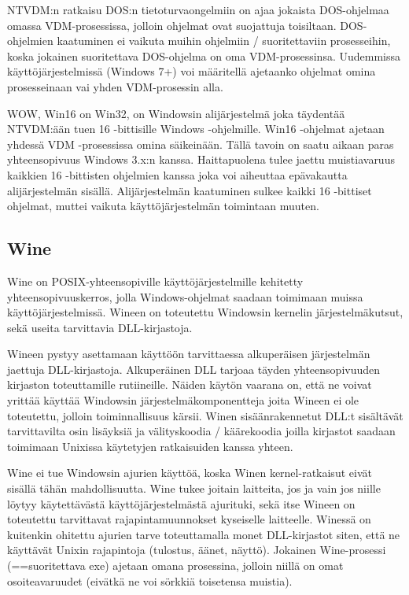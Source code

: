 NTVDM:n ratkaisu DOS:n tietoturvaongelmiin on ajaa jokaista DOS-ohjelmaa omassa VDM-prosessissa, jolloin ohjelmat ovat suojattuja toisiltaan. DOS-ohjelmien kaatuminen ei vaikuta muihin ohjelmiin / suoritettaviin prosesseihin, koska jokainen suoritettava DOS-ohjelma on oma VDM-prosessinsa. Uudemmissa käyttöjärjestelmissä (Windows 7+) voi määritellä ajetaanko ohjelmat omina prosesseinaan vai yhden VDM-prosessin alla.


WOW, Win16 on Win32, on Windowsin alijärjestelmä joka täydentää NTVDM:ään tuen 16 -bittisille Windows -ohjelmille. Win16 -ohjelmat ajetaan yhdessä VDM -prosessissa omina säikeinään. Tällä tavoin on saatu aikaan paras yhteensopivuus Windows 3.x:n kanssa. Haittapuolena tulee jaettu muistiavaruus kaikkien 16 -bittisten ohjelmien kanssa joka voi aiheuttaa epävakautta alijärjestelmän sisällä. Alijärjestelmän kaatuminen sulkee kaikki 16 -bittiset ohjelmat, muttei vaikuta käyttöjärjestelmän toimintaan muuten.


\subsection{Wine}
Wine on POSIX-yhteensopiville käyttöjärjestelmille kehitetty yhteensopivuuskerros, jolla Windows-ohjelmat saadaan toimimaan muissa käyttöjärjestelmissä. Wineen on toteutettu Windowsin kernelin järjestelmäkutsut, sekä useita tarvittavia DLL-kirjastoja.

Wineen pystyy asettamaan käyttöön tarvittaessa alkuperäisen järjestelmän jaettuja DLL-kirjastoja. Alkuperäinen DLL tarjoaa täyden yhteensopivuuden kirjaston toteuttamille rutiineille. Näiden käytön vaarana on, että ne voivat yrittää käyttää Windowsin järjestelmäkomponentteja joita Wineen ei ole toteutettu, jolloin toiminnallisuus kärsii. Winen sisäänrakennetut DLL:t sisältävät tarvittavilta osin lisäyksiä ja välityskoodia / käärekoodia joilla kirjastot saadaan toimimaan Unixissa käytetyjen ratkaisuiden kanssa yhteen.

Wine ei tue Windowsin ajurien käyttöä, koska Winen kernel-ratkaisut eivät sisällä tähän mahdollisuutta. Wine tukee joitain laitteita, jos ja vain jos niille löytyy käytettävästä käyttöjärjestelmästä ajurituki, sekä itse Wineen on toteutettu tarvittavat rajapintamuunnokset kyseiselle laitteelle. Winessä on kuitenkin ohitettu ajurien tarve toteuttamalla monet DLL-kirjastot siten, että ne käyttävät Unixin rajapintoja (tulostus, äänet, näyttö). Jokainen Wine-prosessi (==suoritettava exe) ajetaan omana prosessina, jolloin niillä on omat osoiteavaruudet (eivätkä ne voi sörkkiä toisetensa muistia).


